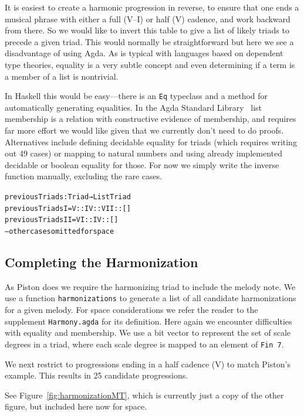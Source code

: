 It is easiest to create a harmonic progression in reverse, to
ensure that one ends a musical phrase with either a full (V--I) or half (V)
cadence, and work backward from there. So we would like to invert this
table to give a list of likely triads to precede a given triad. This
would normally be straightforward but here we see a disadvantage of
using Agda. As is typical with languages based on dependent type
theories, equality is a very subtle concept and even determining if a
term is a member of a list is nontrivial.

In Haskell this would be easy---there is an \texttt{Eq} typeclass and a
method for automatically generating equalities. In the Agda Standard
Library~\citep{agda-stdlib} list membership is a relation with
constructive evidence of membership, and requires far more effort we
would like given that we currently don't need to do
proofs. Alternatives include defining decidable equality for triads
(which requires writing out 49 cases) or mapping to natural numbers
and using already implemented decidable or boolean equality for
those. For now we simply write the inverse function manually,
excluding the rare cases.

\begin{alltt}
previousTriads : Triad → List Triad
previousTriads I   = V :: IV :: VII :: []
previousTriads II  = VI :: IV :: []
-- other cases omitted for space
\end{alltt}

\subsection{Completing the Harmonization}
\label{sec:harmony:complete}

As Piston does we require the harmonizing triad to include the melody
note. We use a function \texttt{harmonizations} to generate a list of
all candidate harmonizations for a given melody. For space
considerations we refer the reader to the supplement
\texttt{Harmony.agda} for its definition. Here again we encounter difficulties
with equality and membership. We use a bit vector to represent the
set of scale degrees in a triad, where each scale degree is mapped to
an element of \texttt{Fin 7}.

We next restrict to progressions ending in a half cadence (V) to match
Piston's example. This results in 25 candidate progressions.

See Figure~\ref{fig:harmonizationMT}, which is currently just a copy of
the other figure, but included here now for space.

